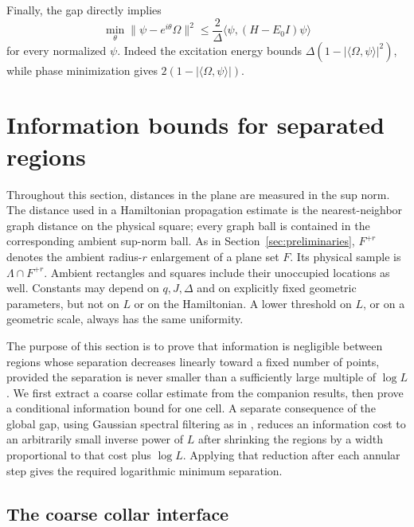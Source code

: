 \documentclass[11pt]{article}
\numberwithin{equation}{section}
\theoremstyle{definition}
\theoremstyle{remark}
\begin{document}
Finally, the gap directly implies
\begin{equation}\label{eq:energy-vector}
 \min_\theta\lVert \psi-e^{i\theta}\Omega\rVert^2
 \le\frac{2}{\Delta}\langle\psi,(H-E_0I)\psi\rangle
\end{equation}
for every normalized $\psi$. Indeed the excitation energy bounds
$\Delta(1-|\langle\Omega,\psi\rangle|^2)$, while phase minimization gives
$2(1-|\langle\Omega,\psi\rangle|)$.

\section{Information bounds for separated regions}
\label{sec:information}

Throughout this section, distances in the plane are measured in the sup
norm.  The distance used in a Hamiltonian propagation estimate is the
nearest-neighbor graph distance on the physical square; every graph ball
is contained in the corresponding ambient sup-norm ball.  As in Section~\ref{sec:preliminaries}, $F^{+r}$ denotes the ambient
radius-$r$ enlargement of a plane set $F$.  Its physical sample is
$\Lambda\cap F^{+r}$.  Ambient rectangles and squares include their
unoccupied locations as well.  Constants
may depend on $q,J,\Delta$ and on explicitly fixed geometric parameters,
but not on $L$ or on the Hamiltonian.  A lower threshold on $L$, or on a
geometric scale, always has the same uniformity.

The purpose of this section is to prove that information is negligible
between regions whose separation decreases linearly toward a fixed
number of points, provided the separation is never smaller than a
sufficiently large multiple of $\log L$.  We first extract a coarse
collar estimate from the companion results, then prove a conditional
information bound for one cell.  A separate consequence of the global
gap, using Gaussian spectral filtering as in \cite{Hastings2006Local}, reduces an information cost to an arbitrarily small inverse
power of $L$ after shrinking the regions by a width proportional to that
cost plus $\log L$.  Applying that reduction after each annular step gives the
required logarithmic minimum separation.

\subsection{The coarse collar interface}
\end{document}
